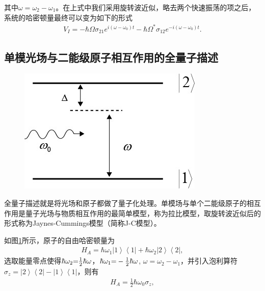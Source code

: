 其中$\omega=\omega_2-\omega_1$。在上式中我们采用旋转波近似，略去两个快速振荡的项之后，系统的哈密顿量最终可以变为如下的形式
\begin{align}
{V_I} =  - \hbar \Omega {\sigma _{21}}{e^{i\left( {\omega  - {\omega _0}} \right)t}} - \hbar {\Omega ^*}{\sigma _{12}}{e^{ - i\left( {\omega  - {\omega _0}} \right)t}}.\label{eq50}
\end{align}

\subsection{单模光场与二能级原子相互作用的全量子描述}\label{paf}

\begin{figure}[htbp]
	\centering
	\includegraphics[scale=0.5]{Img/Fig_2.jpg}
		\label{figure2}
\end{figure}

全量子描述就是将光场和原子都做了量子化处理。单模场与单个二能级原子的相互作用是量子光场与物质相互作用的最简单模型，称为拉比模型，取旋转波近似后的形式称为Jaynes-Cummings模型（简称J-C模型）。

如图\ref{figure2}所示，原子的自由哈密顿量为
\begin{align}
{H_A} = \hbar {\omega _1}\left| 1 \right\rangle \left\langle 1 \right| + \hbar {\omega _2}\left| 2 \right\rangle \left\langle 2 \right|,\label{eq51}
\end{align}
选取能量零点使得$\hbar {\omega _2}{\rm{ = }}\frac{1}{2}\hbar \omega$，$\hbar {\omega _1}{\rm{ = }} - \frac{1}{2}\hbar \omega$, $\omega  = {\omega _2} - {\omega _1}$，并引入泡利算符${\sigma _z} = \left| 2 \right\rangle \left\langle 2 \right| - \left| 1 \right\rangle \left\langle 1 \right|$，则有
\begin{align}
{H_A} = \frac{1}{2}\hbar {\omega _0}{\sigma _z},\label{eq52}
\end{align}

